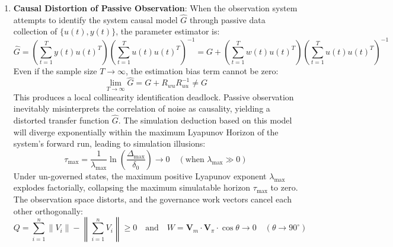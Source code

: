 \documentclass{article}
\begin{document}
\begin{enumerate}
    \item \textbf{Causal Distortion of Passive Observation}:
    When the observation system attempts to identify the system causal model $\hat{G}$ through passive data collection of $\{u(t), y(t)\}$, the parameter estimator is:
    \begin{equation}
        \hat{G} = \left(\sum_{t=1}^T y(t) u(t)^T \right) \left(\sum_{t=1}^T u(t) u(t)^T \right)^{-1} = G + \left(\sum_{t=1}^T w(t) u(t)^T \right) \left(\sum_{t=1}^T u(t) u(t)^T \right)^{-1}
    \end{equation}
    Even if the sample size $T \to \infty$, the estimation bias term cannot be zero:
    \begin{equation}
        \lim_{T \to \infty} \hat{G} = G + R_{wu} R_{uu}^{-1} \neq G
    \end{equation}
    This produces a local collinearity identification deadlock. Passive observation inevitably misinterprets the correlation of noise as causality, yielding a distorted transfer function $\hat{G}$. The simulation deduction based on this model will diverge exponentially within the maximum Lyapunov Horizon of the system's forward run, leading to simulation illusions:
    \begin{equation}\label{lyapunov-horizon}
        \tau_{\text{max}} = \frac{1}{\lambda_{\text{max}}} \ln \left( \frac{\Delta_{\text{max}}}{\delta_0} \right) \to 0 \quad (\text{when } \lambda_{\text{max}} \gg 0)
    \end{equation}
    Under un-governed states, the maximum positive Lyapunov exponent $\lambda_{\text{max}}$ explodes factorially, collapsing the maximum simulatable horizon $\tau_{\text{max}}$ to zero. The observation space distorts, and the governance work vectors cancel each other orthogonally:
    \begin{equation}
        Q = \sum_{i=1}^{n} \|V_i\| - \left\| \sum_{i=1}^{n} V_i \right\| \ge 0 \quad \text{and} \quad W = \mathbf{V}_m \cdot \mathbf{V}_{\pi} \cdot \cos\theta \to 0 \quad (\theta \to 90^\circ)
    \end{equation}


\end{enumerate}
\end{document}
